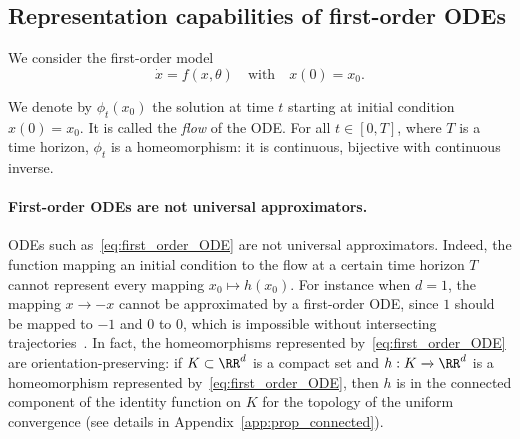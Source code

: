 \documentclass{article}
\begin{document}
\subsection{Representation capabilities of first-order ODEs}\label{section:representation_capabilitie}
We consider the first-order model 
\begin{equation}\label{eq:first_order_ODE}
\dot{x} = f(x,\theta)
   \quad\text{with}\quad
  x(0) = x_0. 
\end{equation}

We denote by $\phi_t(x_0)$ the solution at time $t$ starting at initial condition $x(0) = x_0$. It is called the \textit{flow} of the ODE. For all $t \in [0,T]$, where $T$ is a time horizon, $\phi_t$ is a homeomorphism: it is continuous, bijective with continuous inverse. 

\paragraph{First-order ODEs are not universal approximators.}

ODEs such as~\eqref{eq:first_order_ODE} are not universal approximators. Indeed, the function mapping an initial condition to the flow at a certain time horizon $T$ cannot represent every mapping $x_0 \mapsto h(x_0)$. For instance when $d= 1$, the mapping $x \to -x$ cannot be approximated by a first-order ODE, since $1$ should be mapped to $-1$ and $0$ to $0$, which is impossible without intersecting trajectories~\citep{dupont2019augmented}. In fact, the homeomorphisms represented by~\eqref{eq:first_order_ODE} are orientation-preserving: if $K \subset \RR^d$ is a compact set and $h : K\xrightarrow{} \RR^d$ is a homeomorphism represented by~\eqref{eq:first_order_ODE}, then $h$ is in the connected component of the identity function on $K$ for the topology of the uniform convergence (see details in Appendix~\ref{app:prop_connected}). 
\end{document}
